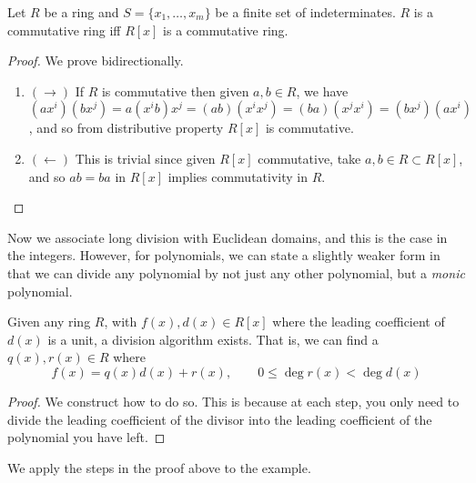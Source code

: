   \begin{theorem}
    Let $R$ be a ring and $S = \{x_1, \ldots, x_m\}$ be a finite set of indeterminates. $R$ is a commutative ring iff $R[x]$ is a commutative ring. 
  \end{theorem}
  \begin{proof}
    We prove bidirectionally. 
    \begin{enumerate}
      \item $(\rightarrow)$ If $R$ is commutative then given $a, b \in R$, we have $(ax^i) (b x^j) = a (x^i b) x^j = (ab)(x^i x^j) = (ba) (x^j x^i) = (b x^j) (a x^i)$, and so from distributive property $R[x]$ is commutative. 
      \item $(\leftarrow)$ This is trivial since given $R[x]$ commutative, take $a, b \in R \subset R[x]$, and so $ab = ba$ in $R[x]$ implies commutativity in $R$. 
    \end{enumerate}
  \end{proof}

  Now we associate long division with Euclidean domains, and this is the case in the integers. However, for polynomials, we can state a slightly weaker form in that we can divide any polynomial by not just any other polynomial, but a \textit{monic} polynomial. 

  \begin{theorem}
    \label{thm:poly-long-division}
    Given any ring $R$, with $f(x), d(x) \in R[x]$ where the leading coefficient of $d(x)$ is a unit, a division algorithm exists. That is, we can find a $q(x), r(x) \in R$ where 
    \begin{equation}
      f(x) = q(x) d(x) + r(x), \qquad 0 \leq \deg{r(x)} < \deg{d(x)}
    \end{equation}
  \end{theorem}
  \begin{proof}
    We construct how to do so. This is because at each step, you only need to divide the leading coefficient of the divisor into the leading coefficient of the polynomial you have left. 
  \end{proof}

  \begin{example} 
    We apply the steps in the proof above to the example. 
    \begin{center}
    \end{center}
  \end{example} 

